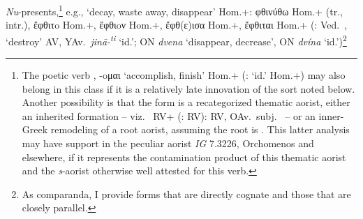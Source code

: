 \documentclass[output=paper,colorlinks,citecolor=brown]{langscibook}
\begin{document}
\begin{exe}
\ex \label{ex:nu} \textit{Nu}-presents,\footnote{The poetic verb , -oμαι ‘accomplish, finish’ Hom.+ (:   ‘id.’ Hom.+) may also belong in this class if it is a relatively late innovation of the sort noted below. Another possibility is that the form is a recategorized thematic aorist, either an inherited formation -- viz.\  RV+ (:  RV):  RV, OAv.\  subj.\   -- or an inner-Greek remodeling of a root aorist, assuming the root is . This latter analysis may have support in the peculiar aorist  \textit{IG} 7.3226, Orchomenos and elsewhere, if it represents the contamination product of this thematic aorist and the \textit{s}-aorist otherwise well attested for this verb.}  e.g., 
  ‘decay, waste away, disappear’ Hom.+: φθινύθω  Hom.+ (tr., intr.), ἔφθιτo Hom.+, ἔφθιoν Hom.+, ἔφθ(ε)ισα Hom.+, ἔφθιται Hom.+ 
(: Ved.\ ,  ‘destroy’ AV, YAv.\ \textit{jinā-\textsuperscript{ti}}  ‘id.’; ON \textit{dvena} ‘disappear, decrease', ON \textit{dvína}  ‘id.’)\footnote{As comparanda, I provide forms that are directly cognate and those that are closely parallel.}
\end{exe}
\end{document}
